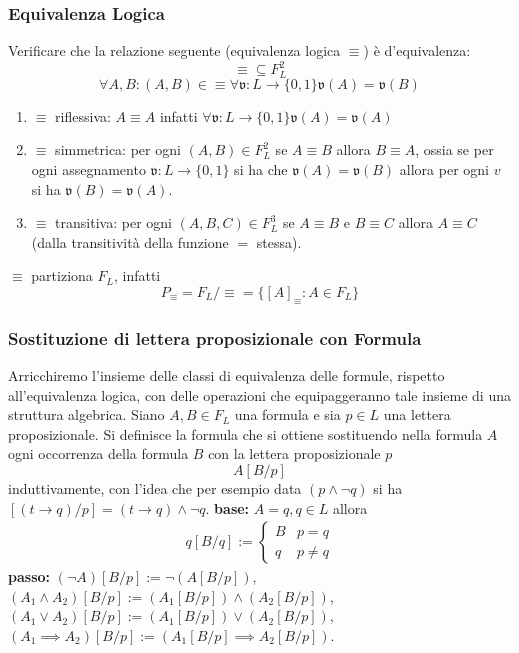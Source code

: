 \subsubsection{Equivalenza Logica}
Verificare che la relazione seguente (equivalenza logica $\equiv$) è d'equivalenza: 
$$ 
\equiv \subseteq F_L^2
$$
$$
\forall A,B: (A,B) \in \equiv \forall \mathfrak{v}:L\rightarrow \{0,1\} \mathfrak{v}(A) = \mathfrak{v}(B)
$$
\begin{enumerate}
  \item $\equiv$ riflessiva: $A \equiv A$ infatti $\forall \mathfrak{v}:L \rightarrow \{0,1\} \mathfrak{v}(A) = \mathfrak{v}(A)$
  \item $\equiv$ simmetrica: per ogni $(A,B) \in F_L^2$ se $A \equiv B$ allora
    $B \equiv A$, ossia se per ogni assegnamento $\mathfrak{v}:L \rightarrow \{0,1\}$ si 
    ha che $\mathfrak{v}(A) = \mathfrak{v}(B)$ allora per ogni $v$ si ha $\mathfrak{v}(B) = \mathfrak{v}(A)$. 
  \item $\equiv$ transitiva: per ogni $(A,B,C) \in F_L^3$ se $A \equiv B$ e 
    $B \equiv C$ allora $A \equiv C$ (dalla transitività della funzione 
    $=$ stessa). 
\end{enumerate}

$\equiv$ partiziona $F_L$, infatti 
$$
P_{\equiv} = F_L/\equiv =  \{ [A]_{\equiv} : A \in F_L\}
$$
\noindent 
\subsubsection{Sostituzione di lettera proposizionale con Formula}
Arricchiremo l'insieme delle classi di equivalenza delle formule, rispetto 
all'equivalenza logica, con delle operazioni che equipaggeranno tale insieme 
di una struttura algebrica.
Siano $A, B \in F_L$ una formula e sia $p \in L$ una lettera proposizionale. 
Si definisce la formula che si ottiene sostituendo nella formula $A$ ogni 
occorrenza della formula $B$ con la lettera proposizionale $p$
$$
A[B/p]
$$
induttivamente, con l'idea che per esempio data $(p \land \neg q)$ si ha 
$[(t \rightarrow q)/p] = (t\rightarrow q) \land \neg q$. 
\newline
\textbf{base:} $A = q, q \in L$  allora 
\begin{align*}
  q[B/q] := 
  \begin{cases}
    B & p = q \\
    q & p \neq q 
  \end{cases}
\end{align*}
\newline
\textbf{passo:}  
$(\neg A)[B/p] := \neg(A[B/p])$, 
$(A_1 \land A_2)[B/p] := (A_1[B/p]) \land (A_2[B/p])$, 
$(A_1 \lor A_2)[B/p] := (A_1[B/p]) \lor (A_2[B/p])$, 
$(A_1 \implies A_2)[B/p] := (A_1[B/p] \implies A_2[B/p])$. 

